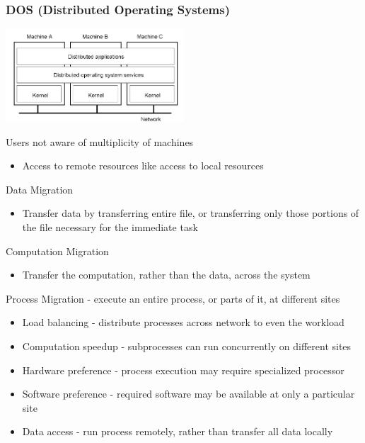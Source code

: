 \subsubsection{DOS (Distributed Operating Systems)}
\begin{center}
    \includegraphics[width=0.5\textwidth]{img/DOS1.jpg}
\end{center}
Users not aware of multiplicity of machines
\begin{itemize}
    \item Access to remote resources like access to local resources
\end{itemize}
Data Migration
\begin{itemize}
    \item Transfer data by transferring entire file, or transferring only those portions of the file necessary for the immediate task
\end{itemize}
Computation Migration
\begin{itemize}
    \item Transfer the computation, rather than the data, across the system
\end{itemize}
Process Migration - execute an entire process, or parts of it, at different sites
\begin{itemize}
    \item Load balancing - distribute processes across network to even the workload
    \item Computation speedup - subprocesses can run concurrently on different sites
    \item Hardware preference - process execution may require specialized processor
    \item Software preference - required software may be available at only a particular site
    \item Data access - run process remotely, rather than transfer all data locally
\end{itemize}

